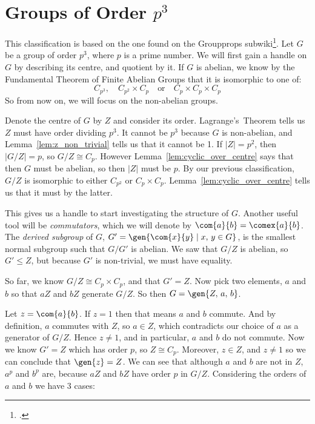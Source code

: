 \section{Groups of Order \(p^3\)}
This classification is based on the one found on the Groupprops subwiki\footcite{pcubed}.
Let \(G\) be a group of order \(p^3\), where \(p\) is a prime number.
We will first gain a handle on \(G\) by describing its centre, and quotient by it.
If \(G\) is abelian, we know by the Fundamental Theorem of Finite Abelian Groups that it is isomorphic to one of:
\[C_{p^3}, \quad C_{p^2} \times C_p \quad \text{or} \quad C_p \times C_p \times C_p\]
So from now on, we will focus on the non-abelian groups.

Denote the centre of \(G\) by \(Z\) and consider its order.
Lagrange's~Theorem tells us \(Z\) must have order dividing \(p^3\).
It cannot be \(p^3\) because \(G\) is non-abelian, and Lemma~\ref{lem:z_non_trivial} tells us that it cannot be 1.
If \(|Z| = p^2\), then \(|G/Z| = p\), so \(G/Z \cong C_p\).
However Lemma~\ref{lem:cyclic_over_centre} says that then \(G\) must be abelian, so then \(|Z|\) must be \(p\).
By our previous classification, \(G/Z\) is isomorphic to either \(C_{p^2}\) or \(C_p \times C_p\).
Lemma~\ref{lem:cyclic_over_centre} tells us that it must by the latter.

This gives us a handle to start investigating the structure of \(G\).
Another useful tool will be \emph{commutators}, which we will denote by \(\com{a}{b} = \comex{a}{b}\).
The \emph{derived subgroup} of \(G\), \(G' = \gen{\com{x}{y} \mid x,\,y \in G}\), is the smallest normal
subgroup such that \(G/G'\) is abelian.
We saw that \(G/Z\) is abelian, so \(G' \leqslant Z\), but because \(G'\) is non-trivial, we must have equality.

So far, we know \(G/Z \cong C_p \times C_p\), and that \(G' = Z\).
Now pick two elements, \(a\) and \(b\) so that \(aZ\) and \(bZ\) generate \(G/Z\).
So then \(G = \gen{Z,\,a,\,b}\).

Let \(z = \com{a}{b}\).
If \(z = 1\) then that means \(a\) and \(b\) commute.
And by definition, \(a\) commutes with \(Z\), so \(a \in Z\), which contradicts our choice of \(a\) as a generator of
\(G/Z\).
Hence \(z \neq 1\), and in particular, \(a\) and \(b\) do not commute.
Now we know \(G' = Z\) which has order \(p\), so \(Z \cong C_p\).
Moreover, \(z \in Z\), and \(z \neq 1\) so we can conclude that \(\gen{z} = Z\).
We can see that although \(a\) and \(b\) are not in \(Z\), \(a^p\) and \(b^p\) are, because \(aZ\) and \(bZ\) have order
\(p\) in \(G/Z\).
Considering the orders of \(a\) and \(b\) we have 3 cases:

